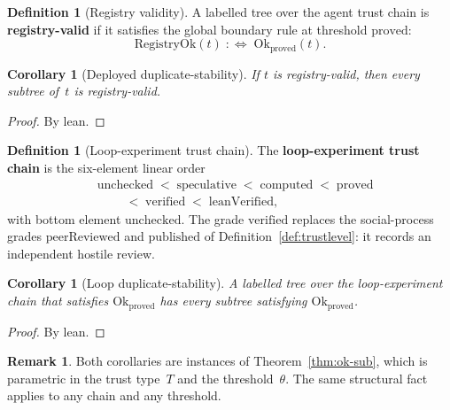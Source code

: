 \documentclass[11pt,a4paper]{article}
\theoremstyle{plain}
\newtheorem{corollary}[theorem]{Corollary}
\theoremstyle{definition}
\newtheorem{definition}[theorem]{Definition}
\newtheorem{remark}[theorem]{Remark}
\newcommand{\Ok}{\mathrm{Ok}}
\begin{document}
\begin{definition}[Registry validity]\label{def:registryok}
A labelled tree over the agent trust chain is \textbf{registry-valid} if
it satisfies the global boundary rule at threshold $\mathrm{proved}$:
\begin{equation}
  \mathrm{RegistryOk}(t)
  \;:\!\!\Longleftrightarrow\;
  \Ok_{\mathrm{proved}}(t).
\end{equation}
\end{definition}

\begin{corollary}[Deployed duplicate-stability]\label{cor:registryok-sub}
If $t$ is registry-valid, then every subtree of~$t$ is registry-valid.
\end{corollary}

\begin{proof}
By lean.
\end{proof}

\begin{definition}[Loop-experiment trust chain]\label{def:looptrust}
The \textbf{loop-experiment trust chain} is the six-element linear order
\begin{align*}
  &\mathrm{unchecked}
  \;<\; \mathrm{speculative}
  \;<\; \mathrm{computed}
  \;<\; \mathrm{proved} \\
  &\qquad
  \;<\; \mathrm{verified}
  \;<\; \mathrm{leanVerified},
\end{align*}
with bottom element $\mathrm{unchecked}$. The grade $\mathrm{verified}$
replaces the social-process grades $\mathrm{peerReviewed}$ and
$\mathrm{published}$ of Definition~\ref{def:trustlevel}: it records an
independent hostile review.
\end{definition}

\begin{corollary}[Loop duplicate-stability]\label{cor:loopok-sub}
A labelled tree over the loop-experiment chain that satisfies
$\Ok_{\mathrm{proved}}$ has every subtree satisfying
$\Ok_{\mathrm{proved}}$.
\end{corollary}

\begin{proof}
By lean.
\end{proof}

\begin{remark}
Both corollaries are instances of Theorem~\ref{thm:ok-sub}, which is
parametric in the trust type~$T$ and the threshold~$\theta$. The same
structural fact applies to any chain and any threshold.
\end{remark}
\end{document}
